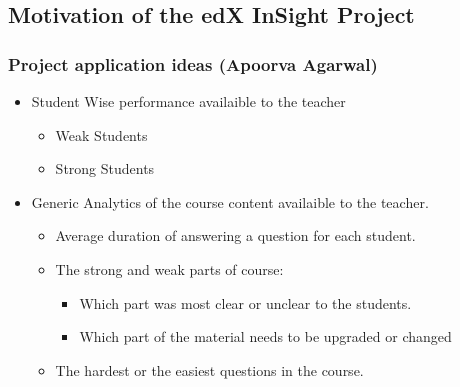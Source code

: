 \documentclass[12pt,xcolor=dvipsnames]{beamer}
\begin{document}

\subsection{Motivation of the edX InSight Project}
\begin{frame}[t]
\frametitle{Project application ideas (Apoorva Agarwal)}

\begin{itemize}

\item Student Wise performance availaible to the teacher

\begin{itemize}
\item Weak Students
\item Strong Students
\end{itemize}

\item Generic Analytics of the course content availaible to the teacher.

\begin{itemize}
\item Average duration of answering a question for each student.
\item The strong and weak parts of course:

\begin{itemize}
\item Which part was most clear or unclear to the students.
\item Which part of the material needs to be upgraded or changed
\end{itemize}

\item The hardest or the easiest questions in the course.
\end{itemize}

\end{itemize}

\end{frame}
\end{document}
